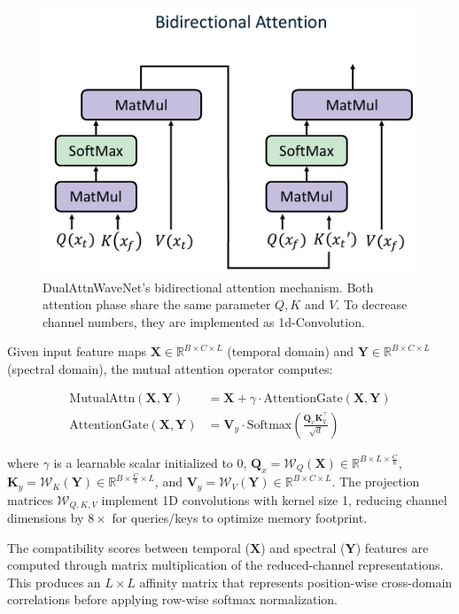 \documentclass[conference]{IEEEtran}
\begin{document}
\begin{figure}[tb]
    \centering
    \includegraphics[width=0.7\linewidth]{bidirectional-attention.pdf}
    \caption{DualAttnWaveNet's bidirectional attention mechanism. Both attention phase share the same parameter $Q, K$ and $V$. To decrease channel numbers, they are implemented as 1d-Convolution.}
    \label{fig:bidirectional-attention}
\end{figure}

Given input feature maps $\mathbf{X} \in \mathbb{R}^{B \times C \times L}$ (temporal domain) and $\mathbf{Y} \in \mathbb{R}^{B \times C \times L}$ (spectral domain), the mutual attention operator computes:

\begin{equation}
    \begin{aligned}
        \text{MutualAttn}(\mathbf{X}, \mathbf{Y})    & = \mathbf{X} + \gamma \cdot \text{AttentionGate}(\mathbf{X}, \mathbf{Y})                        \\
        \text{AttentionGate}(\mathbf{X}, \mathbf{Y}) & = \mathbf{V}_y \cdot \text{Softmax}\left(\frac{\mathbf{Q}_x \mathbf{K}_y^\top}{\sqrt{d}}\right)
    \end{aligned}
\end{equation}

where $\gamma$ is a learnable scalar initialized to 0, $\mathbf{Q}_x = \mathcal{W}_Q(\mathbf{X}) \in \mathbb{R}^{B \times L \times \frac{C}{8}}$, $\mathbf{K}_y = \mathcal{W}_K(\mathbf{Y}) \in \mathbb{R}^{B \times \frac{C}{8} \times L}$, and $\mathbf{V}_y = \mathcal{W}_V(\mathbf{Y}) \in \mathbb{R}^{B \times C \times L}$. The projection matrices $\mathcal{W}_{Q,K,V}$ implement 1D convolutions with kernel size 1, reducing channel dimensions by $8\times$ for queries/keys to optimize memory footprint.

The compatibility scores between temporal ($\mathbf{X}$) and spectral ($\mathbf{Y}$) features are computed through matrix multiplication of the reduced-channel representations. This produces an $L \times L$ affinity matrix that represents position-wise cross-domain correlations before applying row-wise softmax normalization.
\end{document}

